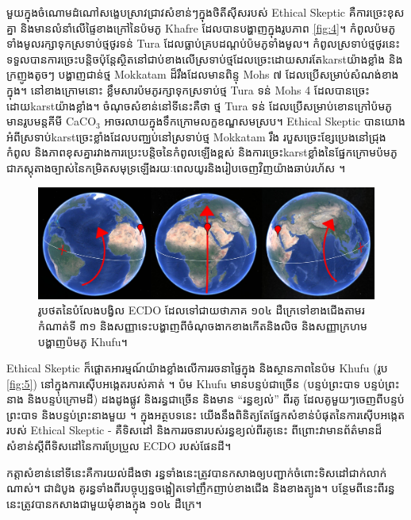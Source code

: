 \documentclass[10pt,twocolumn,letterpaper]{article}
\begin{document}
មួយក្នុងចំណោមដំណៅសង្ខេបស្រាវជ្រាវសំខាន់ៗក្នុងថិតីស៊ីសរបស់ Ethical Skeptic គឺការច្រេះខុសគ្នា និងមានលំនាំលើផ្ទៃខាងក្រៅនៃប៉មភូ Khafre ដែលបានបង្ហាញក្នុងរូបភាព \ref{fig:4}។ កំពូលប៉មភូទាំងមូលរក្សាទុកស្រទាប់ថ្មថូរទន់ Tura ដែលធ្លាប់គ្របដណ្តប់ប៉មភូទាំងមូល។ កំពូលស្រទាប់ថ្មថូរនេះទទួលបានការច្រេះបន្តិចប៉ុន្តែស្ថិតនៅជាប់ខាងលើស្រទាប់ថ្មដែលច្រេះដោយសារតែkarstយ៉ាងខ្លាំង និងក្រញូងតូចៗ បង្ហាញជាន់ថ្ម Mokkatam ដ៏រឹងដែលមានពិន្ទុ Mohs ៧ ដែលប្រើសម្រាប់សំណង់ខាងក្នុង។ នៅខាងក្រោមនោះ ខ្លឹមសារប៉មភូរក្សាទុកស្រទាប់ថ្ម Tura ទន់ Mohs 4 ដែលបានច្រេះដោយkarstយ៉ាងខ្លាំង។ ចំណុចសំខាន់នៅទីនេះគឺថា ថ្ម Tura ទន់ ដែលប្រើសម្រាប់ខោនក្រៅប៉មភូ មានរូបមន្តគីមី CaCO$_3$ អាចរលាយក្នុងទឹកក្រោមលក្ខខណ្ឌសមស្រប។ Ethical Skeptic បានយោងអំពីស្រទាប់karstច្រេះខ្លាំងដែលបញ្ឈប់នៅស្រទាប់ថ្ម Mokkatam រឹង របួសច្រេះខ្សែប្រេងនៅជ្រុងកំពូល និងភាពខុសគ្នារវាងការប្រេះបន្តិចនៃកំពូលឡើងខ្ពស់ និងការច្រេះkarstខ្លាំងនៃផ្នែកក្រោមប៉មភូ ជាភស្តុតាងច្បាស់នៃកម្រិតសមុទ្រឡើងរយៈពេលយូរនិងរៀបចេញវិញយ៉ាងឆាប់រហ័ស \cite{27}។

\begin{figure}[b]
\begin{center}
\includegraphics[width=1\textwidth]{drawing.jpg}
\end{center}
   \caption{រូបថតនៃបំលែងបង្វិល ECDO ដែលទៅជាយថាភាគ ១០៤ ដឺក្រេទៅខាងជើងតាមរកំណាត់ទី ៣១ និងសញ្ញាទេះបង្ហាញពីចំណុចងាកខាងកើតនិងលិច និងសញ្ញាក្រហមបង្ហាញប៉មភូ Khufu។}
\label{fig:6}
\end{figure}
Ethical Skeptic ក៏ផ្តោតអារម្មណ៍យ៉ាងខ្លាំងលើការរចនាផ្ទៃក្នុង និងស្ថានភាពនៃប៉ម Khufu (រូប \ref{fig:5}) នៅក្នុងការស៊ើបអង្កេតរបស់គាត់ \cite{28}។ ប៉ម Khufu មានបន្ទប់ជាច្រើន (បន្ទប់ព្រះបាទ បន្ទប់ព្រះនាង និងបន្ទប់ក្រោមដី) ដងដូងផ្លូវ និងរន្ធជាច្រើន និងមាន “រន្ធខ្យល់” ពីរគូ ដែលគូមួយៗចេញពីបន្ទប់ព្រះបាទ និងបន្ទប់ព្រះនាងមួយ \cite{29,30}។ ក្នុងអត្ថបទនេះ យើងនឹងពិនិត្យតែផ្នែកសំខាន់បំផុតនៃការស៊ើបអង្កេតរបស់ Ethical Skeptic - គឺទិសដៅ និងការរចនារបស់រន្ធខ្យល់ពីរគូនេះ ពីព្រោះវាមានព័ត៌មានដ៏សំខាន់ស្តីពីទិសដៅនៃការប្រែប្រួល ECDO របស់ផែនដី។

កត្តាសំខាន់នៅទីនេះគឺការយល់ដឹងថា រន្ធទាំងនេះត្រូវបានកសាងឲ្យបញ្ជាក់ចំពោះទិសដៅជាក់លាក់ណាស់។ ជាដំបូង គូរន្ធទាំងពីរបច្ចុប្បន្នចង្អៀតទៅញឹកញាប់ខាងជើង និងខាងត្បូង។ បន្ថែមពីនេះពីរន្ធនេះត្រូវបានកសាងជាមួយមុំខាងក្នុង ១០៤ ដឺក្រេ។
\end{document}
